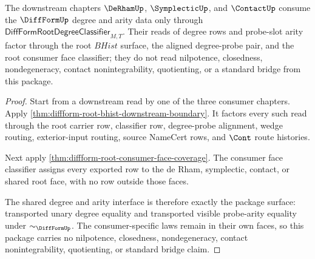 \begin{theorem}
\label{thm:diffform-root-degree-classifier-downstream-consumption}
The downstream chapters $\DeRhamUp$, $\SymplecticUp$, and $\ContactUp$
consume the $\DiffFormUp$ degree and arity data only through
$\mathsf{DiffFormRootDegreeClassifier}_{M,T}$. Their reads of degree rows and
probe-slot arity factor through the root $BHist$ surface, the aligned
degree-probe pair, and the root consumer face classifier; they do not read
nilpotence, closedness, nondegeneracy, contact nonintegrability, quotienting,
or a standard bridge from this package.
\end{theorem}
\begin{proof}
Start from a downstream read by one of the three consumer chapters. Apply
\autoref{thm:diffform-root-bhist-downstream-boundary}. It factors every such
read through the root carrier row, classifier row, degree-probe alignment,
wedge routing, exterior-input routing, source NameCert rows, and $\Cont$
route histories.

Next apply \autoref{thm:diffform-root-consumer-face-coverage}. The consumer
face classifier assigns every exported row to the de Rham, symplectic,
contact, or shared root face, with no row outside those faces.

The shared degree and arity interface is therefore exactly the package
surface: transported unary degree equality and transported visible
probe-arity equality under $\sim_{\DiffFormUp}$. The consumer-specific laws
remain in their own faces, so this package carries no nilpotence, closedness,
nondegeneracy, contact nonintegrability, quotienting, or standard bridge
claim.
\end{proof}
